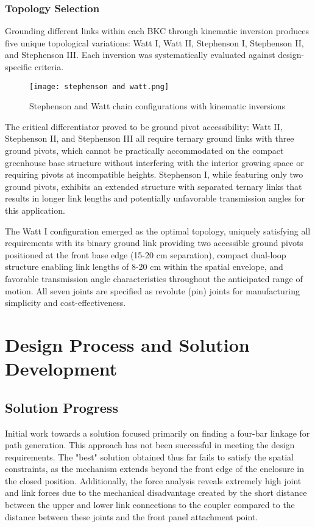 \documentclass[12pt]{article}
\begin{document}
\subsubsection{Topology Selection}
Grounding different links within each BKC through kinematic inversion produces five unique topological variations: Watt I, Watt II, Stephenson I, Stephenson II, and Stephenson III. Each inversion was systematically evaluated against design-specific criteria.

\begin{figure}[H]
    \centering
    \texttt{[image: stephenson and watt.png]}
    \caption{Stephenson and Watt chain configurations with kinematic inversions}
    \label{fig:stephenson_watt}
\end{figure}

The critical differentiator proved to be ground pivot accessibility: Watt II, Stephenson II, and Stephenson III all require ternary ground links with three ground pivots, which cannot be practically accommodated on the compact greenhouse base structure without interfering with the interior growing space or requiring pivots at incompatible heights. Stephenson I, while featuring only two ground pivots, exhibits an extended structure with separated ternary links that results in longer link lengths and potentially unfavorable transmission angles for this application.

The Watt I configuration emerged as the optimal topology, uniquely satisfying all requirements with its binary ground link providing two accessible ground pivots positioned at the front base edge (15-20 cm separation), compact dual-loop structure enabling link lengths of 8-20 cm within the spatial envelope, and favorable transmission angle characteristics throughout the anticipated range of motion. All seven joints are specified as revolute (pin) joints for manufacturing simplicity and cost-effectiveness.

\section{Design Process and Solution Development}
\label{sec:design_process}

\subsection{Solution Progress}
\label{sec:solution_progress}

Initial work towards a solution focused primarily on finding a four-bar linkage for path generation. This approach has not been successful in meeting the design requirements. The "best" solution obtained thus far fails to satisfy the spatial constraints, as the mechanism extends beyond the front edge of the enclosure in the closed position. Additionally, the force analysis reveals extremely high joint and link forces due to the mechanical disadvantage created by the short distance between the upper and lower link connections to the coupler compared to the distance between these joints and the front panel attachment point.
\end{document}
